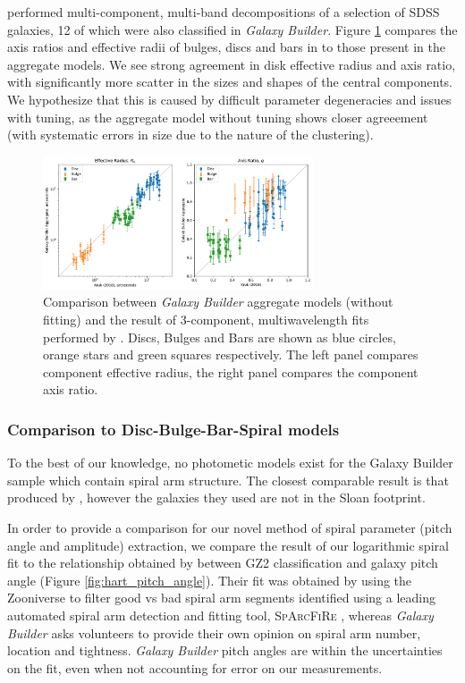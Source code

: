 \documentclass[../main.tex]{subfiles}
\begin{document}
\citet{2018MNRAS.473.4731K} performed multi-component, multi-band decompositions of a selection of SDSS galaxies, 12 of which were also classified in \textit{Galaxy Builder}. Figure \ref{fig:sd_comp_comparison} compares the axis ratios and effective radii of bulges, discs and bars in \citet{2018MNRAS.473.4731K} to those present in the aggregate models. We see strong agreement in disk effective radius and axis ratio, with significantly more scatter in the sizes and shapes of the central components. We hypothesize that this is caused by difficult parameter degeneracies and issues with tuning, as the aggregate model without tuning shows closer agreeement (with systematic errors in size due to the nature of the clustering).

\begin{figure}
  \includegraphics[width=8cm]{images__results/sd_comp_comparison.pdf}
  \caption{Comparison between \textit{Galaxy Builder} aggregate models (without fitting) and the result of 3-component, multi\-wavelength fits performed by \citet{2018MNRAS.473.4731K}. Discs, Bulges and Bars are shown as blue circles, orange stars and green squares respectively. The left panel compares component effective radius, the right panel compares the component axis ratio.}
  \label{fig:sd_comp_comparison}
\end{figure}


\subsubsection{Comparison to Disc-Bulge-Bar-Spiral models}
To the best of our knowledge, no photometic models exist for the Galaxy Builder sample which contain spiral arm structure. The closest comparable result is that produced by \citet{Gao2017:1709.00746v1}, however the galaxies they used are not in the Sloan footprint.

In order to provide a comparison for our novel method of spiral parameter (pitch angle and amplitude) extraction, we compare the result of our logarithmic spiral fit to the relationship obtained by \citet{Hart2016:1607.01019v1} between GZ2 classification and galaxy pitch angle (Figure \ref{fig:hart_pitch_angle}). Their fit was obtained by using the Zooniverse to filter good vs bad spiral arm segments identified using a leading automated spiral arm detection and fitting tool, \textsc{SpArcFiRe} \citep{Davis2014:1402.1910v1}, whereas \textit{Galaxy Builder} asks volunteers to provide their own opinion on spiral arm number, location and tightness. \textit{Galaxy Builder} pitch angles are within the uncertainties on the \citet{Hart2016:1607.01019v1} fit, even when not accounting for error on our measurements.
\end{document}

